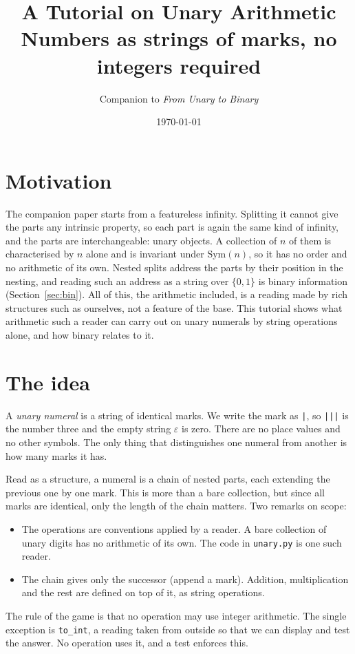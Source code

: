 \documentclass[11pt]{article}
\title{A Tutorial on Unary Arithmetic\\\large Numbers as strings of marks, no integers required}
\author{Companion to \emph{From Unary to Binary}}
\date{\today}
\newcommand{\m}{\texttt{|}}
\begin{document}
\maketitle

\section{Motivation}
The companion paper starts from a featureless infinity. Splitting it cannot give
the parts any intrinsic property, so each part is again the same kind of infinity,
and the parts are interchangeable: unary objects. A collection of $n$ of them is
characterised by $n$ alone and is invariant under $\mathrm{Sym}(n)$, so it has no
order and no arithmetic of its own. Nested splits address the parts by their
position in the nesting, and reading such an address as a string over $\{0,1\}$ is
binary information (Section~\ref{sec:bin}). All of this, the arithmetic included,
is a reading made by rich structures such as ourselves, not a feature of the base.
This tutorial shows what arithmetic such a reader can carry out on unary numerals
by string operations alone, and how binary relates to it.

\section{The idea}
A \emph{unary numeral} is a string of identical marks. We write the mark as \m{}, so
\m\m\m{} is the number three and the empty string $\varepsilon$ is zero. There are no
place values and no other symbols. The only thing that distinguishes one numeral
from another is how many marks it has.

Read as a structure, a numeral is a chain of nested parts, each extending the
previous one by one mark. This is more than a bare collection, but since all marks
are identical, only the length of the chain matters. Two remarks on scope:
\begin{itemize}
  \item The operations are conventions applied by a reader. A bare collection of
        unary digits has no arithmetic of its own. The code in \texttt{unary.py} is
        one such reader.
  \item The chain gives only the successor (append a mark). Addition,
        multiplication and the rest are defined on top of it, as string operations.
\end{itemize}
The rule of the game is that no operation may use integer arithmetic. The single
exception is \texttt{to\_int}, a reading taken from outside so that we can display
and test the answer. No operation uses it, and a test enforces this.
\end{document}
